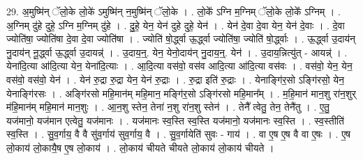 \documentclass[17pt]{extarticle}
\begin{document}
29. अ॒मुष्मि॑न् ॅलो॒के लो॒के॑ ऽमुष्मि॑न् न॒मुष्मि॑न् ॅलो॒के । . लो॒के᳚ ऽग्नि म॒ग्निम् ॅलो॒के लो॒के᳚ ऽग्निम् । . अ॒ग्निम् दु॑हे दुहे॒ ऽग्नि म॒ग्निम् दु॑हे । . दु॒हे॒ येन॒ येन॑ दुहे दुहे॒ येन॑ । . येन॑ दे॒वा दे॒वा येन॒ येन॑ दे॒वाः । . दे॒वा ज्योति॑षा॒ ज्योति॑षा दे॒वा दे॒वा ज्योति॑षा । . ज्योति॑ षो॒र्द्ध्वा ऊ॒र्द्ध्वा ज्योति॑षा॒ ज्योति॑ षो॒र्द्ध्वाः । . ऊ॒र्द्ध्वा उ॒दाय॑न् नु॒दाय॑न् नू॒र्द्ध्वा ऊ॒र्द्ध्वा उ॒दायन्न्॑ । . उ॒दाय॒न्॒. येन॒ येनो॒दाय॑न् नु॒दाय॒न्॒. येन॑ । . उ॒दाय॒न्नित्यु॑त् - आयन्न्॑ । . येना॑दि॒त्या आ॑दि॒त्या येन॒ येना॑दि॒त्याः । . आ॒दि॒त्या वस॑वो॒ वस॑व आदि॒त्या आ॑दि॒त्या वस॑वः । . वस॑वो॒ येन॒ येन॒ वस॑वो॒ वस॑वो॒ येन॑ । . येन॑ रु॒द्रा रु॒द्रा येन॒ येन॑ रु॒द्राः । . रु॒द्रा इति॑ रु॒द्राः । . येनाङ्गि॑र॒सो ऽङ्गि॑रसो॒ येन॒ येनाङ्गि॑रसः । . अङ्गि॑रसो महि॒मान॑म् महि॒मान॒ मङ्गि॑र॒सो ऽङ्गि॑रसो महि॒मान᳚म् । . म॒हि॒मान॑ मान॒शु रा॑न॒शुर् म॑हि॒मान॑म् महि॒मान॑ मान॒शुः । . आ॒न॒शु स्तेन॒ तेना॑ न॒शु रा॑न॒शु स्तेन॑ । . तेनै᳚ त्वेतु॒ तेन॒ तेनै॑तु । . ए॒तु॒ यज॑मानो॒ यज॑मान एत्वेतु॒ यज॑मानः । . यज॑मानः स्व॒स्ति स्व॒स्ति यज॑मानो॒ यज॑मानः स्व॒स्ति । . स्व॒स्तीति॑ स्व॒स्ति । . सु॒व॒र्गाय॒ वै वै सु॑व॒र्गाय॑ सुव॒र्गाय॒ वै । . सु॒व॒र्गायेति॑ सुवः - गाय॑ । . वा ए॒ष ए॒ष वै वा ए॒षः । . ए॒ष लो॒काय॑ लो॒कायै॒ष ए॒ष लो॒काय॑ । . लो॒काय॑ चीयते चीयते लो॒काय॑ लो॒काय॑ चीयते । \newline
\end{document}
